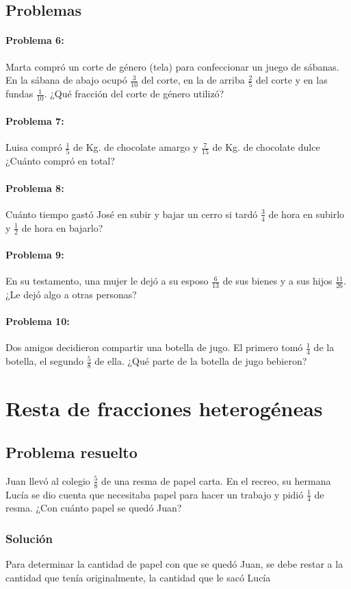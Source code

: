 \documentclass[10pt,twoside]{article}
\begin{document}
\subsection*{Problemas}
\paragraph*{Problema 6:} Marta compró un corte de género (tela) para confeccionar un juego de sábanas. En la sábana de abajo ocupó $\frac{3}{10}$ del corte, en la de arriba $\frac{2}{5}$ del corte y en las fundas $\frac{1}{10}$. ¿Qué fracción del corte de género utilizó?
\paragraph*{Problema 7:} Luisa compró $\frac{1}{5}$ de Kg. de chocolate amargo y $\frac{7}{15}$ de Kg. de chocolate dulce ¿Cuánto compró en total?
\paragraph*{Problema 8:} Cuánto tiempo gastó José en subir y bajar un cerro si tardó $\frac{3}{4}$ de hora en subirlo y $\frac{1}{2}$ de hora en bajarlo?
\paragraph*{Problema 9:} En su testamento, una mujer le dejó a su esposo $\frac{6}{13}$ de sus bienes y a sus hijos $\frac{11}{26}$. ¿Le dejó algo a otras personas?
\paragraph*{Problema 10:} Dos amigos decidieron compartir una botella de jugo. El primero tomó $\frac{1}{4}$ de la botella, el segundo $\frac{5}{8}$ de ella. ¿Qué parte de la botella de jugo bebieron?
\section*{Resta de fracciones heterog\'{e}neas}
\subsection*{Problema resuelto}
Juan llevó al colegio $\frac{5}{8}$ de una resma de 
 papel carta. En el recreo, su hermana Lucía se dio cuenta que necesitaba papel para hacer un trabajo y pidió $\frac{1}{4}$ de resma. ¿Con cuánto papel se quedó Juan? 
\subsubsection*{Soluci\'{o}n}
Para determinar la cantidad de papel con que se quedó Juan, se debe restar a la cantidad que tenía originalmente, la cantidad que le sacó Lucía 
\end{document}

